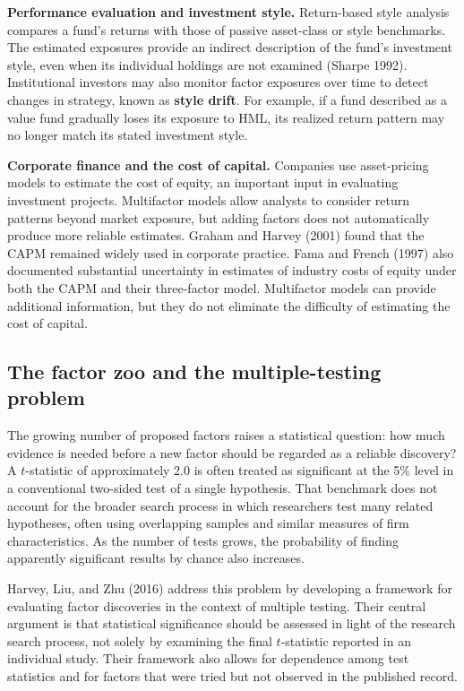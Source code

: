 \textbf{Performance evaluation and investment style.}
Return-based style analysis compares a fund's returns with those of passive asset-class or style benchmarks. The estimated exposures provide an indirect description of the fund's investment style, even when its individual holdings are not examined (Sharpe 1992). Institutional investors may also monitor factor exposures over time to detect changes in strategy, known as \textbf{style drift}. For example, if a fund described as a value fund gradually loses its exposure to HML, its realized return pattern may no longer match its stated investment style.

\textbf{Corporate finance and the cost of capital.}
Companies use asset-pricing models to estimate the cost of equity, an important input in evaluating investment projects. Multifactor models allow analysts to consider return patterns beyond market exposure, but adding factors does not automatically produce more reliable estimates. Graham and Harvey (2001) found that the CAPM remained widely used in corporate practice. Fama and French (1997) also documented substantial uncertainty in estimates of industry costs of equity under both the CAPM and their three-factor model. Multifactor models can provide additional information, but they do not eliminate the difficulty of estimating the cost of capital.


\subsection{The factor zoo and the multiple-testing problem}
\label{sec:03-multiple-testing}

The growing number of proposed factors raises a statistical question: how much evidence is needed before a new factor should be regarded as a reliable discovery? A $t$-statistic of approximately 2.0 is often treated as significant at the 5\% level in a conventional two-sided test of a single hypothesis. That benchmark does not account for the broader search process in which researchers test many related hypotheses, often using overlapping samples and similar measures of firm characteristics. As the number of tests grows, the probability of finding apparently significant results by chance also increases.

Harvey, Liu, and Zhu (2016) address this problem by developing a framework for evaluating factor discoveries in the context of multiple testing. Their central argument is that statistical significance should be assessed in light of the research search process, not solely by examining the final $t$-statistic reported in an individual study. Their framework also allows for dependence among test statistics and for factors that were tried but not observed in the published record.

